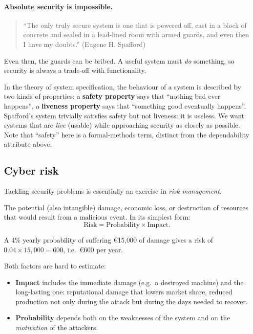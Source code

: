 \paragraph{Absolute security is impossible.}
\begin{quote}
\enquote{The only truly secure system is one that is powered off, cast in a block of concrete and sealed in a lead-lined room with armed guards, and even then I have my doubts.} (Eugene H. Spafford)
\end{quote}
Even then, the guards can be bribed. A useful system must \emph{do} something, so security is always a trade-off with functionality.

\begin{remark}
In the theory of system specification, the behaviour of a system is described by two kinds of properties: a \textbf{safety property} says that \enquote{nothing bad ever happens}, a \textbf{liveness property} says that \enquote{something good eventually happens}. Spafford's system trivially satisfies safety but not liveness: it is useless. We want systems that are \emph{live} (usable) while approaching security as closely as possible. Note that \enquote{safety} here is a formal-methods term, distinct from the dependability attribute above.
\end{remark}

\subsection{Cyber risk}

Tackling security problems is essentially an exercise in \emph{risk management}.

\begin{definition}[Risk]
The potential (also intangible) damage, economic loss, or destruction of resources that would result from a malicious event. In its simplest form:
\[
    \text{Risk} = \text{Probability} \times \text{Impact}.
\]
\end{definition}

\begin{example}
A 4\% yearly probability of suffering €15{,}000 of damage gives a risk of $0.04 \times 15{,}000 = 600$, i.e.\ €600 per year.
\end{example}

Both factors are hard to estimate:
\begin{itemize}
    \item \textbf{Impact} includes the immediate damage (e.g.\ a destroyed machine) and the long-lasting one: reputational damage that lowers market share, reduced production not only during the attack but during the days needed to recover.
    \item \textbf{Probability} depends both on the weaknesses of the system and on the \emph{motivation} of the attackers.
\end{itemize}

